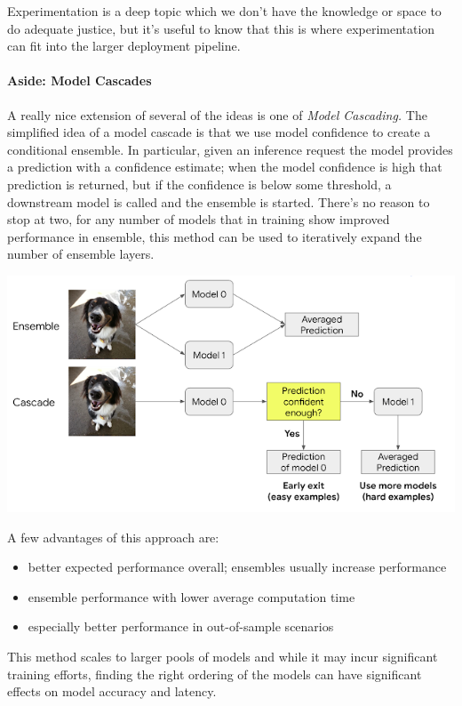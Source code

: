 Experimentation is a deep topic which we don't have the knowledge or space to do adequate justice, but it's useful to know that this is where experimentation can fit into the larger deployment pipeline.

\paragraph{Aside: Model Cascades}

A really nice extension of several of the ideas is one of \emph{Model Cascading.} The simplified idea of a model cascade is that we use model confidence to create a conditional ensemble. In particular, given an inference request the model provides a prediction with a confidence estimate; when the model confidence is high that prediction is returned, but if the confidence is below some threshold, a downstream model is called and the ensemble is started. There's no reason to stop at two, for any number of models that in training show improved performance in ensemble, this method can be used to iteratively expand the number of ensemble layers. 

\includegraphics[width=\textwidth-10pt]{book-text/model-cascades.png}

A few advantages of this approach are:

\begin{itemize}
\item better expected performance overall; ensembles usually increase performance
\item ensemble performance with lower average computation time
\item especially better performance in out-of-sample scenarios
\end{itemize}

This method scales to larger pools of models and while it may incur significant training efforts, finding the right ordering of the models can have significant effects on model accuracy and latency.